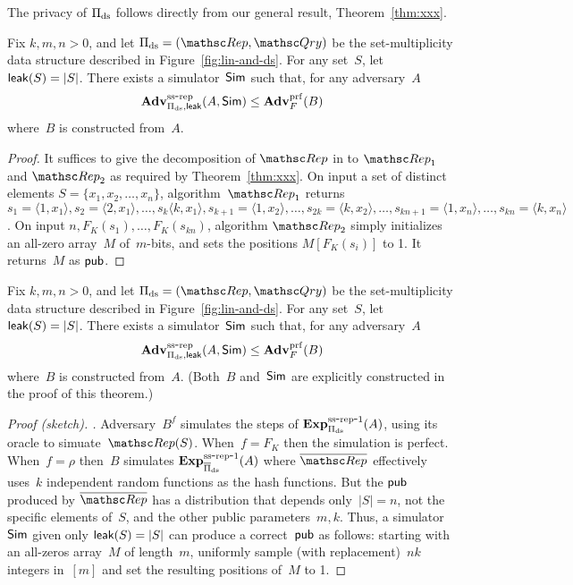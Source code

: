 The privacy of $\Pi_{\mathrm{ds}}$ follows directly from our general result, Theorem~\ref{thm:xxx}.
\begin{theorem}\label{thm:ds-ss}
Fix $k,m,n>0$, and let $\setprim_{\mathrm{ds}}= (\Rep, \Qry)$ be the set-multiplicity data structure described in Figure~\ref{fig:lin-and-ds}.  For any set~$S$, let ${\sf leak}(S)=|S|$.  There exists a simulator~${\sf Sim}$ such that, for any adversary~$A$
\[
\mathrm{\mathbf{Adv}}^{\mathrm{ss\mbox{-}rep}}_{\Pi_{\mathrm{ds}},{\sf leak}}(A,{\sf Sim}) \leq  \mathbf{Adv}^{\mathrm{prf}}_{F}(B)
\]
where~$B$ is constructed from~$A$.  
\end{theorem}
\begin{proof}
It suffices to give the decomposition of $\Rep$ in to $\Rep_1$ and $\Rep_2$ as required by Theorem~\ref{thm:xxx}.
On input a set of distinct elements $S=\{x_1,x_2,\ldots,x_n\}$, algorithm~$\Rep_1$ returns $s_1=\langle 1,x_1 \rangle, s_2=\langle 2,x_1 \rangle, \ldots, s_k\langle k,x_1\rangle, s_{k+1}=\langle 1,x_2\rangle, \ldots, s_{2k}=\langle k,x_2\rangle, \ldots ,s_{kn+1}=\langle 1,x_n\rangle, \ldots, s_{kn}=\langle k,x_n \rangle$.  On input $n,F_K(s_1),\ldots,F_K(s_{kn})$, algorithm $\Rep_2$ simply initializes an all-zero array~$M$ of~$m$-bits, and sets the positions $M[F_K(s_i)]$ to 1.  It returns~$M$ as ${\sf pub}$.
\end{proof}

\begin{theorem}\label{thm:ds-ss}
Fix $k,m,n>0$, and let $\setprim_{\mathrm{ds}}= (\Rep, \Qry)$ be the set-multiplicity data structure described in Figure~\ref{fig:lin-and-ds}.  For any set~$S$, let ${\sf leak}(S)=|S|$.  There exists a simulator~${\sf Sim}$ such that, for any adversary~$A$
\[
\mathrm{\mathbf{Adv}}^{\mathrm{ss\mbox{-}rep}}_{\Pi_{\mathrm{ds}},{\sf leak}}(A,{\sf Sim}) \leq  \mathbf{Adv}^{\mathrm{prf}}_{F}(B)
\]
where~$B$ is constructed from~$A$.  (Both~$B$ and~${\sf Sim}$ are explicitly constructed in the proof of this theorem.)
\end{theorem}
\begin{proof}[Proof (sketch). ] 
Adversary~$B^{f}$ simulates the steps of $\mathrm{\mathbf{Exp}}^{\mathrm{ss\mbox{-}rep\mbox{-}1}}_{\Pi_{\mathrm{ds}}}(A)$, using its oracle to simuate~$\Rep(S)$.  When~$f=F_K$ then the simulation is perfect.  When~$f=\rho$ then~$B$ simulates $\mathrm{\mathbf{Exp}}^{\mathrm{ss\mbox{-}rep\mbox{-}1}}_{\overline{\Pi}_{\mathrm{ds}}}(A)$ where $\overline{\Rep}$ effectively uses~$k$ independent random functions as the hash functions.  But the ${\sf pub}$ produced by $\overline{\Rep}$ has a distribution that depends only~$|S|=n$, not the specific elements of~$S$, and the other public parameters~$m,k$.  Thus, a simulator~${\sf Sim}$ given only ${\sf leak}(S)=|S|$ can produce a correct~${\sf pub}$ as follows: starting with an all-zeros array~$M$ of length~$m$, uniformly sample (with replacement)~$nk$ integers in~$[m]$ and set the resulting positions of~$M$ to 1.
\end{proof}

